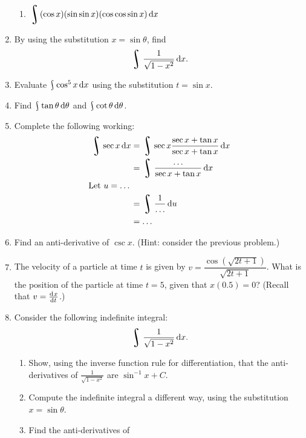 \begin{enumerate}
\begin{multicols}{2}
\begin{enumerate}
      \item $\displaystyle \rint (\cos x) (\sin \sin x) (\cos \cos \sin x) \dif{x} $
    \end{enumerate}
    \end{multicols}
  \item By using the substitution $ x = \sin \theta $, find
        \begin{displaymath}
          \rint \frac{1}{\sqrt{1 - x^2}} \dif{x}.
        \end{displaymath}
  \item Evaluate $ \rint \cos^5 x \dif{x} $ using the substitution $ t = \sin x $.
  \item Find $ \rint \tan \theta \dif{\theta} $ and $ \rint \cot \theta \dif{\theta} $.
  \item Complete the following working:
        \begin{align*}
          \rint \sec x \dif{x} &= \rint \sec x \frac{\sec x + \tan x}{\sec x + \tan x} \dif{x}\\
                              &= \rint \frac{\dots}{\sec x + \tan x} \dif{x}\\
                              \text{Let $ u = \dots $}\\
                              &= \rint \frac{1}{\dots} \dif{u}\\
                              &= \dots
        \end{align*}
  \item Find an anti-derivative of $ \csc x $. (Hint: consider the previous problem.)
  \item The velocity of a particle at time $ t $ is given by $ v = \dfrac{\cos(\sqrt{2t + 1})}{\sqrt{2t + 1}} $.
        What is the position of the particle at time $ t = 5 $, given that $ x(0.5) = 0 $? (Recall that $ v = \od{x}{t} $.)
  \item Consider the following indefinite integral:
        \begin{displaymath}
          \rint \frac{1}{\sqrt{1 - x^2}} \dif{x}.
        \end{displaymath}
    \begin{enumerate}
      \item Show, using the inverse function rule for differentiation, that the anti-derivatives
            of $ \frac{1}{\sqrt{1 - x^2}} $ are $ \sin^{-1} x + C $.
      \item Compute the indefinite integral a different way, using the substitution $ x = \sin \theta $.
      \item Find the anti-derivatives of

\end{enumerate}
\end{enumerate}
